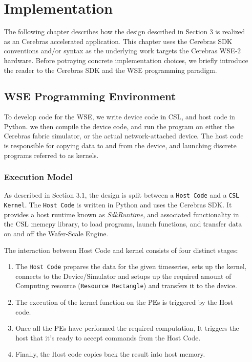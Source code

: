 
\chapter{Implementation}\label{chapter:implementation}

The following chapter describes how the design described in Section 3 is realized as an Cerebras accelerated application. This chapter uses the Cerebras SDK conventions and/or syntax as the underlying work targets the Cerebras WSE-2 hardware.
Before potraying concrete implementation choices, we briefly introduce the reader to the Cerebras SDK and the WSE programming paradigm.
\clearpage
\section{WSE Programming Environment}

To develop code for the WSE, we write device code in CSL, and host code in Python. we then compile the device code, and run the program on either the Cerebras fabric simulator, or the actual network-attached device. The host code is responsible for copying data to and from the device, and launching discrete programs referred to as kernels.

\subsection{Execution Model}

As described in Section 3.1, the design is split between a \texttt{Host Code} and a \texttt{CSL Kernel}. The \texttt{Host Code} is written in Python and uses the Cerebras SDK. It provides a host runtime known as \textit{SdkRuntime}, and associated functionality in the CSL memcpy library, to load programs, launch functions, and transfer data on and off the Wafer-Scale Engine.

The interaction between Host Code and kernel consists of four distinct stages:

\begin{enumerate}
    \item The \texttt{Host Code}  prepares the data for the given timeseries, sets up the kernel, connects to the Device/Simulator and setups up the required amount of Computing resource (\texttt{Resource Rectangle}) and transfers it to the device.
    \item The execution of the kernel function on the PEs is triggered by the Host code.
    \item Once all the PEs have performed the required computation, It triggers the host that it's ready to accept commands from the Host Code.
    \item Finally, the Host code copies back the result into host memory.  
\end{enumerate}


